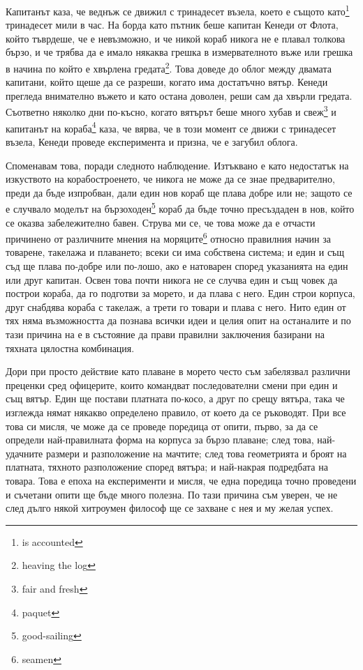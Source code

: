 \documentclass[12pt]{book}
\begin{document}
Капитанът каза, че веднъж се движил с тринадесет възела, което е същото като\footnote{is accounted} тринадесет мили в час. На борда като пътник беше капитан Кенеди от Флота, който тъврдеше, че е невъзможно, и че никой кораб никога не е плавал толкова бързо, и че трябва да е имало някаква грешка в измервателното въже или грешка в начина по който е хвърлена гредата\footnote{heaving the log}. Това доведе до облог между двамата капитани, който щеше да се разреши, когато има достатъчно вятър. Кенеди прегледа внимателно въжето и като остана доволен, реши сам да хвърли гредата. Съответно няколко дни по-късно, когато вятърът беше много хубав и свеж\footnote{fair and fresh} и капитанът на кораба\footnote{paquet} каза, че вярва, че в този момент се движи с тринадесет възела, Кенеди проведе експеримента и призна, че е загубил облога.

Споменавам това, поради следното наблюдение. Изтъквано е като недостатък на изкуството на корабостроенето, че никога не може да се знае предварително, преди да бъде изпробван, дали един нов кораб ще плава добре или не; защото се е случвало моделът на бързоходен\footnote{good-sailing} кораб да бъде точно пресъздаден в нов, който се оказва забележително бавен. Струва ми се, че това може да е отчасти причинено от различните мнения на моряците\footnote{seamen} относно правилния начин за товарене, такелажа и плаването; всеки си има собствена система; и един и същ съд ще плава по-добре или по-лошо, ако е натоварен според указанията на един или друг капитан. Освен това почти никога не се случва един и същ човек да построи кораба, да го подготви за морето, и да плава с него. Един строи  корпуса, друг снабдява кораба с такелаж, а трети го товари и плава с него. Нито един от тях няма възможността да познава всички идеи и целия опит на останалите и по тази причина на е в състояние да прави правилни заключения базирани на тяхната цялостна комбинация. 

Дори при просто действие като плаване в морето често съм забелязвал различни преценки сред офицерите, които командват последователни смени при един и същ вятър. Един ще постави платната по-косо, а друг по срещу вятъра, така че изглежда нямат някакво определено правило, от което да се ръководят. При все това си мисля, че може да се проведе поредица от опити, първо, за да се определи най-правилната форма на корпуса за бързо плаване; след това, най-удачните размери и разположение на мачтите; след това геометрията и броят на платната, тяхното разположение според вятъра; и най-накрая подредбата на товара. Това е епоха на експерименти и мисля, че една поредица точно проведени и съчетани опити ще бъде много полезна. По тази причина съм уверен, че не след дълго някой хитроумен философ ще се захване с нея и му желая успех.
\end{document}
